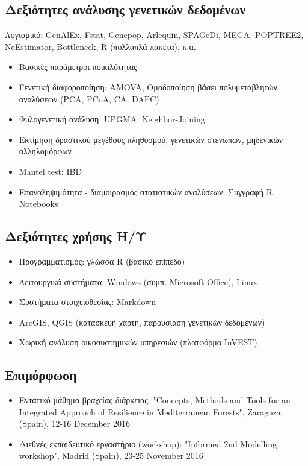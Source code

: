 \documentclass[12pt,]{scrartcl}
\begin{document}
\subsection{Δεξιότητες ανάλυσης γενετικών δεδομένων}\label{genetics}
\vspace{-3mm}
Λογισμικό: GenAlEx, Fstat, Genepop, Arlequin, SPAGeDi, MEGA, POPTREE2, NeEstimator, Bottleneck, R (πολλαπλά πακέτα), κ.α.
\begin{itemize}
\vspace{-1mm}
\setlength\itemsep{-0.6em}
\item Βασικές παράμετροι ποικιλότητας
\item Γενετική διαφοροποίηση: AMOVA, Ομαδοποίηση βάσει πολυμεταβλητών αναλύσεων (PCA, PCoA, CA, DAPC)
\item Φυλογενετική ανάλυση: UPGMA, Neighbor-Joining
\item Εκτίμηση δραστικού μεγέθους πληθυσμού, γενετικών στενωπών, μηδενικών αλληλομόρφων 
\item Mantel test: IBD
\item Επαναληψιμότητα - διαμοιρασμός στατιστικών αναλύσεων: Συγγραφή R Notebooks
\end{itemize}

\subsection{Δεξιότητες χρήσης Η/Υ}\label{it}
\begin{itemize}
\vspace{-3mm}
\setlength\itemsep{-0.6em}
\item Προγραμματισμός: γλώσσα R (βασικό επίπεδο)
\item Λειτουργικά συστήματα: Windows (συμπ. Microsoft Office), Linux
\item Συστήματα στοιχειοθεσίας: Markdown
\item ArcGIS, QGIS (κατασκευή χάρτη, παρουσίαση γενετικών δεδομένων)
\item Χωρική ανάλυση οικοσυστημικών υπηρεσιών (πλατφόρμα InVEST)
\end{itemize}

\subsection{Επιμόρφωση}\label{courses}
\begin{itemize}
\vspace{-3mm}
\setlength\itemsep{-0.6em}
\item Εντατικό μάθημα βραχείας διάρκειας: "Concepts, Methods and Tools for an Integrated Approach of Resilience in Mediterranean Forests", Zaragoza (Spain), 12-16 December 2016
\item Διεθνές εκπαιδευτικό εργαστήριο (workshop): "Informed 2nd Modelling workshop", Madrid (Spain), 23-25 November 2016
\end{itemize}
\end{document}
